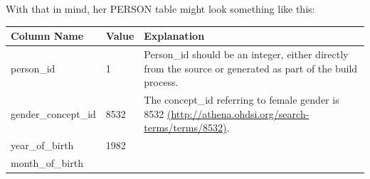 \documentclass[]{book}
\begin{document}
With that in mind, her PERSON table might look something like this:

\begin{longtable}[]{@{}lll@{}}
\toprule
\begin{minipage}[b]{0.33\columnwidth}\raggedright
Column Name\strut
\end{minipage} & \begin{minipage}[b]{0.15\columnwidth}\raggedright
Value\strut
\end{minipage} & \begin{minipage}[b]{0.43\columnwidth}\raggedright
Explanation\strut
\end{minipage}\tabularnewline
\midrule
\endhead
\begin{minipage}[t]{0.33\columnwidth}\raggedright
person\_id\strut
\end{minipage} & \begin{minipage}[t]{0.15\columnwidth}\raggedright
1\strut
\end{minipage} & \begin{minipage}[t]{0.43\columnwidth}\raggedright
Person\_id should be an integer, either directly from the source or generated as part of the build process.\strut
\end{minipage}\tabularnewline
\begin{minipage}[t]{0.33\columnwidth}\raggedright
gender\_concept\_id\strut
\end{minipage} & \begin{minipage}[t]{0.15\columnwidth}\raggedright
8532\strut
\end{minipage} & \begin{minipage}[t]{0.43\columnwidth}\raggedright
The concept\_id referring to female gender is 8532 \href{http://athena.ohdsi.org/search-terms/terms/8532}{(http://athena.ohdsi.org/search-terms/terms/8532)}.\strut
\end{minipage}\tabularnewline
\begin{minipage}[t]{0.33\columnwidth}\raggedright
year\_of\_birth\strut
\end{minipage} & \begin{minipage}[t]{0.15\columnwidth}\raggedright
1982\strut
\end{minipage} & \begin{minipage}[t]{0.43\columnwidth}\raggedright
\strut
\end{minipage}\tabularnewline
\begin{minipage}[t]{0.33\columnwidth}\raggedright
month\_of\_birth\strut
\end{minipage} & \begin{minipage}[t]{0.15\columnwidth}\raggedright

\end{minipage}
\end{longtable}
\end{document}
